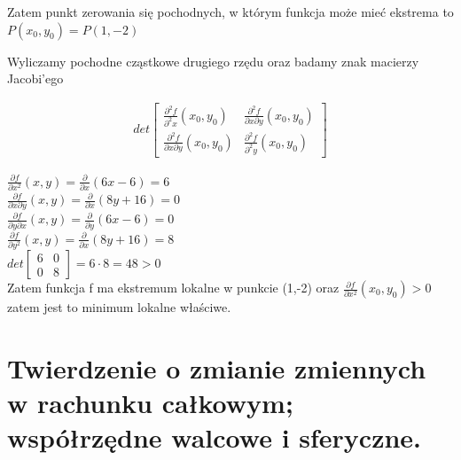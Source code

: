 \documentclass[12pt]{article}
\begin{document}
\begin{itemize}
        Zatem punkt zerowania się pochodnych, w którym funkcja może mieć ekstrema to $P(x_0,y_0) = P(1,-2)$

        Wyliczamy pochodne cząstkowe drugiego rzędu oraz badamy znak macierzy Jacobi'ego

        \begin{equation}
            \begin{aligned}
                det \begin{bmatrix}
                        \frac{\partial^2 f}{\partial^2 x}(x_0, y_0) & \frac{\partial^2 f}{\partial x \partial y}(x_0, y_0) \\
                        \frac{\partial^2 f}{\partial x \partial y}(x_0, y_0) & \frac{\partial^2 f}{\partial^2 y}(x_0, y_0)
                \end{bmatrix}
            \end{aligned}
        \end{equation}
        \newpage

        $\frac{\partial f}{\partial x^2} (x,y) = \frac{\partial}{\partial x} \left( 6x - 6 \right) = 6$
        \\

        $\frac{\partial f}{\partial x \partial y} (x,y)  =  \frac{\partial}{\partial x} \left( 8y + 16 \right) = 0$
        \\

        $\frac{\partial f}{\partial y \partial x} (x,y) = \frac{\partial}{\partial y} \left( 6x - 6 \right) = 0$
        \\

        $\frac{\partial f}{\partial y^2} (x,y)  = \frac{\partial}{\partial x} \left( 8y + 16 \right) = 8$
        \\

        $ det \begin{bmatrix}
                  6 & 0 \\
                  0 & 8
        \end{bmatrix} = 6 \cdot 8 = 48 > 0$ \\

        Zatem funkcja f ma ekstremum lokalne w punkcie (1,-2) oraz $\frac{\partial f}{\partial x^2}(x_0, y_0) > 0$ zatem jest to minimum lokalne właściwe.

    \end{itemize}
    \newpage

    \section{Twierdzenie o zmianie zmiennych w rachunku całkowym; współrzędne walcowe i sferyczne.}
\end{document}
